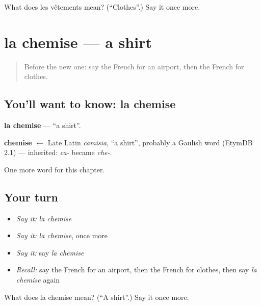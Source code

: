 \begin{tcolorbox}[breakable,colback=teal!4,colframe=teal!35!black,title={Before you move on}]
What does les vêtements mean? (\textquotedblleft{}Clothes\textquotedblright{}.) Say it once more.
\end{tcolorbox}
\section[la chemise]{la chemise — a shirt}

\label{lesson:FR-C103-chemise}



\begin{quote}
Before the new one: say the French for an airport, then the French for clothes.
\end{quote}

\subsection*{You'll want to know: la chemise}
\textbf{la chemise} — \textquotedblleft{}a shirt\textquotedblright{}.

\begin{cousinweb}
\textbf{chemise} $\leftarrow$ Late Latin \emph{camisia}, \textquotedblleft{}a shirt\textquotedblright{}, probably a Gaulish word (EtymDB 2.1) — inherited: \emph{ca-} became \emph{che-}.
\end{cousinweb}

\begin{grammarlens}[title={What you've built}]
One more word for this chapter.
\end{grammarlens}

\subsection*{Your turn}
\begin{itemize}
\raggedright
  \item \emph{Say it:} \emph{la chemise}
  \item \emph{Say it:} \emph{la chemise}, once more
  \item \emph{Say it:} say \emph{la chemise}
  \item \emph{Recall:} say the French for an airport, then the French for clothes, then say \emph{la chemise} again
\end{itemize}

\begin{tcolorbox}[breakable,colback=teal!4,colframe=teal!35!black,title={Before you move on}]
What does la chemise mean? (\textquotedblleft{}A shirt\textquotedblright{}.) Say it once more.
\end{tcolorbox}
